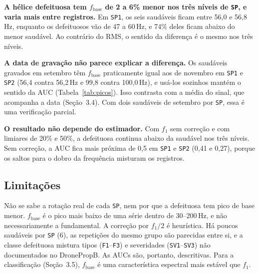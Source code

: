 \textbf{A hélice defeituosa tem $f_\text{base}$ de 2 a 6\% menor nos três níveis de \texttt{SP}, e varia mais entre registros.}
Em \texttt{SP1}, os seis saudáveis ficam entre 56,0 e 56,8\,Hz, enquanto os defeituosos vão de 47 a 60\,Hz, e 74\% deles ficam abaixo do menor saudável.
Ao contrário do RMS, o sentido da diferença é o mesmo nos três níveis.

\textbf{A data de gravação não parece explicar a diferença.}
Os saudáveis gravados em setembro têm $f_\text{base}$ praticamente igual aos de novembro em \texttt{SP1} e \texttt{SP2} (56,4 contra 56,2\,Hz e 99,8 contra 100,0\,Hz), e usá-los sozinhos mantém o sentido da AUC (Tabela~\ref{tab:picos}).
Isso contrasta com a média do sinal, que acompanha a data (Seção~3.4).
Com dois saudáveis de setembro por \texttt{SP}, essa é uma verificação parcial.

\textbf{O resultado não depende do estimador.}
Com $f_1$ sem correção e com limiares de 20\% e 50\%, a defeituosa continua abaixo da saudável nos três níveis.
Sem correção, a AUC fica mais próxima de 0,5 em \texttt{SP1} e \texttt{SP2} (0,41 e 0,27), porque os saltos para o dobro da frequência misturam os registros.

\subsection*{Limitações}

Não se sabe a rotação real de cada \texttt{SP}, nem por que a defeituosa tem pico de base menor.
$f_\text{base}$ é o pico mais baixo de uma série dentro de 30--200\,Hz, e não necessariamente a fundamental.
A correção por $f_1/2$ é heurística.
Há poucos saudáveis por \texttt{SP} (6), as repetições do mesmo grupo são parecidas entre si, e a classe defeituosa mistura tipos (\texttt{F1}--\texttt{F3}) e severidades (\texttt{SV1}--\texttt{SV3}) não documentados no DronePropB.
As AUCs são, portanto, descritivas.
Para a classificação (Seção~3.5), $f_\text{base}$ é uma característica espectral mais estável que $f_1$.
